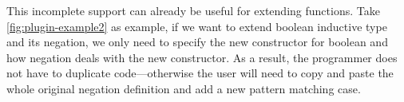 This incomplete support can already be useful for extending functions.
Take \cref{fig:plugin-example2} as example, if we want to extend boolean
inductive type and its negation, we only need to specify the new
constructor for boolean and how negation deals with the new constructor.
As a result, the programmer does not have to duplicate code---otherwise
the user will need to copy and paste the whole original negation
definition and add a new pattern matching case.
